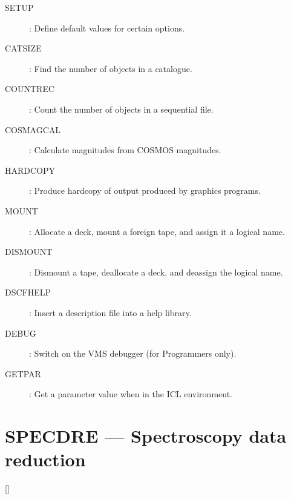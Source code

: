 \begin{description}
\begin{description}
\item [SETUP] : Define default values for certain options.
\item [CATSIZE] : Find the number of objects in a catalogue.
\item [COUNTREC] : Count the number of objects in a sequential file.
\item [COSMAGCAL] : Calculate magnitudes from COSMOS magnitudes.
\item [HARDCOPY] : Produce hardcopy of output produced by graphics programs.
\item [MOUNT] : Allocate a deck, mount a foreign tape, and assign it a 
 logical name.
\item [DISMOUNT] : Dismount a tape, deallocate a deck, and deassign the
 logical name.
\item [DSCFHELP] : Insert a description file into a help library.
\item [DEBUG] : Switch on the VMS debugger (for Programmers only).
\item [GETPAR] : Get a parameter value when in the ICL environment.
\end{description}
\end{description}

\newpage

\section{SPECDRE --- Spectroscopy data reduction}

\vspace{-10mm}

\hfill []

\vspace{2mm}

